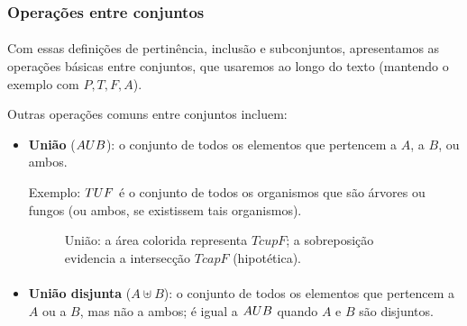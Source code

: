 \documentclass[12pt,a4paper]{article}
\def\\{}%
\def\cup{\string U}%
\def\cap{\string n}%
\begin{document}
\subsubsection{Operações entre conjuntos}
\paragraph{}
Com essas definições de pertinência, inclusão e subconjuntos, apresentamos as operações básicas entre conjuntos, que usaremos ao longo do texto (mantendo o exemplo com \(P,T,F,A\)).

Outras operações comuns entre conjuntos incluem:
\begin{itemize}
    \item \textbf{União} (\(A \cup B\)): o conjunto de todos os elementos que pertencem a \(A\), a \(B\), ou ambos.
    
    Exemplo: \(T \cup F\) é o conjunto de todos os organismos que são árvores ou fungos (ou ambos, se existissem tais organismos).
    \begin{figure}[H]
    \centering
    \caption{União: a área colorida representa $T\\cup F$; a sobreposição evidencia a intersecção $T\\cap F$ (hipotética).}
    \label{fig:op-uniao}
    \end{figure}
    
    \paragraph{}
    \item \textbf{União disjunta} (\(A \uplus B\)): o conjunto de todos os elementos que pertencem a \(A\) ou a \(B\), mas não a ambos; é igual a \(A \cup B\) quando \(A\) e \(B\) são disjuntos.
    

\end{itemize}
\end{document}
